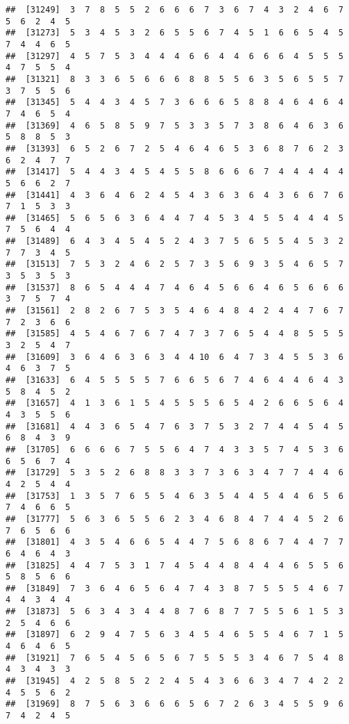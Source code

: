 \documentclass[
]{book}
\begin{document}
\begin{verbatim}
##  [31249]  3  7  8  5  5  2  6  6  6  7  3  6  7  4  3  2  4  6  7  5  6  2  4  5
##  [31273]  5  3  4  5  3  2  6  5  5  6  7  4  5  1  6  6  5  4  5  7  4  4  6  5
##  [31297]  4  5  7  5  3  4  4  4  6  6  4  4  6  6  6  4  5  5  5  4  7  5  5  4
##  [31321]  8  3  3  6  5  6  6  6  8  8  5  5  6  3  5  6  5  5  7  3  7  5  5  6
##  [31345]  5  4  4  3  4  5  7  3  6  6  6  5  8  8  4  6  4  6  4  7  4  6  5  4
##  [31369]  4  6  5  8  5  9  7  5  3  3  5  7  3  8  6  4  6  3  6  5  8  8  5  3
##  [31393]  6  5  2  6  7  2  5  4  6  4  6  5  3  6  8  7  6  2  3  6  2  4  7  7
##  [31417]  5  4  4  3  4  5  4  5  5  8  6  6  6  7  4  4  4  4  4  5  6  6  2  7
##  [31441]  4  3  6  4  6  2  4  5  4  3  6  3  6  4  3  6  6  7  6  7  1  5  3  3
##  [31465]  5  6  5  6  3  6  4  4  7  4  5  3  4  5  5  4  4  4  5  7  5  6  4  4
##  [31489]  6  4  3  4  5  4  5  2  4  3  7  5  6  5  5  4  5  3  2  7  7  3  4  5
##  [31513]  7  5  3  2  4  6  2  5  7  3  5  6  9  3  5  4  6  5  7  3  5  3  5  3
##  [31537]  8  6  5  4  4  4  7  4  6  4  5  6  6  4  6  5  6  6  6  3  7  5  7  4
##  [31561]  2  8  2  6  7  5  3  5  4  6  4  8  4  2  4  4  7  6  7  7  2  3  6  6
##  [31585]  4  5  4  6  7  6  7  4  7  3  7  6  5  4  4  8  5  5  5  3  2  5  4  7
##  [31609]  3  6  4  6  3  6  3  4  4 10  6  4  7  3  4  5  5  3  6  4  6  3  7  5
##  [31633]  6  4  5  5  5  5  7  6  6  5  6  7  4  6  4  4  6  4  3  5  8  4  5  2
##  [31657]  4  1  3  6  1  5  4  5  5  5  6  5  4  2  6  6  5  6  4  4  3  5  5  6
##  [31681]  4  4  3  6  5  4  7  6  3  7  5  3  2  7  4  4  5  4  5  6  8  4  3  9
##  [31705]  6  6  6  6  7  5  5  6  4  7  4  3  3  5  7  4  5  3  6  6  5  6  7  4
##  [31729]  5  3  5  2  6  8  8  3  3  7  3  6  3  4  7  7  4  4  6  4  2  5  4  4
##  [31753]  1  3  5  7  6  5  5  4  6  3  5  4  4  5  4  4  6  5  6  7  4  6  6  5
##  [31777]  5  6  3  6  5  5  6  2  3  4  6  8  4  7  4  4  5  2  6  7  6  5  6  6
##  [31801]  4  3  5  4  6  6  5  4  4  7  5  6  8  6  7  4  4  7  7  6  4  6  4  3
##  [31825]  4  4  7  5  3  1  7  4  5  4  4  8  4  4  4  6  5  5  6  5  8  5  6  6
##  [31849]  7  3  6  4  6  5  6  4  7  4  3  8  7  5  5  5  4  6  7  4  4  3  4  4
##  [31873]  5  6  3  4  3  4  4  8  7  6  8  7  7  5  5  6  1  5  3  2  5  4  6  6
##  [31897]  6  2  9  4  7  5  6  3  4  5  4  6  5  5  4  6  7  1  5  4  6  4  6  5
##  [31921]  7  6  5  4  5  6  5  6  7  5  5  5  3  4  6  7  5  4  8  4  3  4  3  3
##  [31945]  4  2  5  8  5  2  2  4  5  4  3  6  6  3  4  7  4  2  2  4  5  5  6  2
##  [31969]  8  7  5  6  3  6  6  6  5  6  7  2  6  3  4  5  5  9  6  7  4  2  4  5

\end{verbatim}
\end{document}
